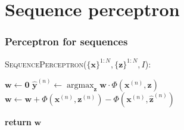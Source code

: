 \documentclass[usenames,dvipsnames]{beamer}
\DeclareMathOperator*{\argmax}{argmax}
\newcommand{\vecb}[1]{\mathbf{#1}}
\newcommand{\x}{\mathbf{x}}
\newcommand{\y}{\mathbf{y}}
\newcommand{\z}{\mathbf{z}}
\newcommand{\w}{\mathbf{w}}
\begin{document}







\section{Sequence perceptron}

\begin{frame}
  \frametitle{Perceptron for sequences}

\begin{block}{\textsc{SequencePerceptron}($\{\x\}^{1:N},\{\z\}^{1:N},I$):}
\begin{algorithmic}[1]
\STATE $\w \leftarrow \vecb{0}$
		\STATE $\hat{\y}^{(n)} \leftarrow \argmax_\z \w \cdot \Phi(\x^{(n)},\z)$ \label{argmax-line}
    		\IF {$\hat{\z}^{(n)} \neq \z^{(n)}$}
        		\STATE $\w \leftarrow \w + \Phi(\x^{(n)},\z^{(n)}) - \Phi(\x^{(n)},\hat{\z}^{(n)})$

    		\ENDIF
    	\ENDFOR
\ENDFOR
\STATE \textbf{return} $\w$
\end{algorithmic}                 
\end{block}
\end{frame}
\end{document}

